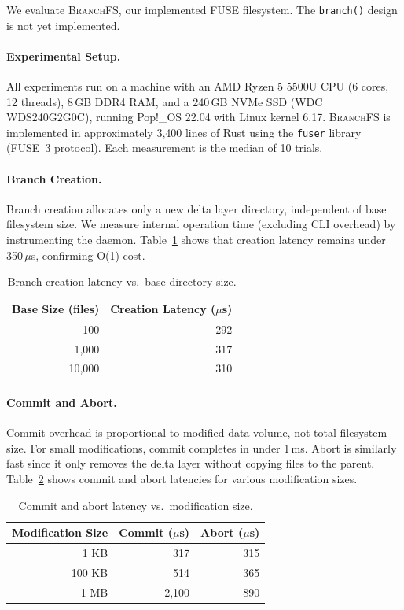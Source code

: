 \documentclass[sigconf]{acmart}
\newcommand{\sys}{\textsc{BranchFS}\xspace}
\newcommand{\syscall}{\texttt{branch()}\xspace}
\begin{document}
We evaluate \sys, our implemented FUSE filesystem. The \syscall design is not yet implemented.

\paragraph{Experimental Setup.}
All experiments run on a machine with an AMD Ryzen 5 5500U CPU (6 cores, 12 threads), 8\,GB DDR4 RAM, and a 240\,GB NVMe SSD (WDC WDS240G2G0C), running Pop!\_OS 22.04 with Linux kernel 6.17. \sys is implemented in approximately 3,400 lines of Rust using the \texttt{fuser} library (FUSE~3 protocol). Each measurement is the median of 10 trials.

\paragraph{Branch Creation.}
Branch creation allocates only a new delta layer directory, independent of base filesystem size. We measure internal operation time (excluding CLI overhead) by instrumenting the daemon. Table~\ref{tab:branch-creation} shows that creation latency remains under 350\,$\mu$s, confirming O(1) cost.

\begin{table}[t]
	\centering
	\caption{Branch creation latency vs.\ base directory size.}
	\label{tab:branch-creation}
	\begin{tabular}{rr}
		\toprule
		Base Size (files) & Creation Latency ($\mu$s) \\
		\midrule
		100               & 292                       \\
		1,000             & 317                       \\
		10,000            & 310                       \\
		\bottomrule
	\end{tabular}
\end{table}

\paragraph{Commit and Abort.}
Commit overhead is proportional to modified data volume, not total filesystem size. For small modifications, commit completes in under 1\,ms. Abort is similarly fast since it only removes the delta layer without copying files to the parent. Table~\ref{tab:commit} shows commit and abort latencies for various modification sizes.

\begin{table}[t]
	\centering
	\caption{Commit and abort latency vs.\ modification size.}
	\label{tab:commit}
	\begin{tabular}{rrr}
		\toprule
		Modification Size & Commit ($\mu$s) & Abort ($\mu$s) \\
		\midrule
		1 KB              & 317             & 315            \\
		100 KB            & 514             & 365            \\
		1 MB              & 2,100           & 890            \\
		\bottomrule
	\end{tabular}
\end{table}
\end{document}
